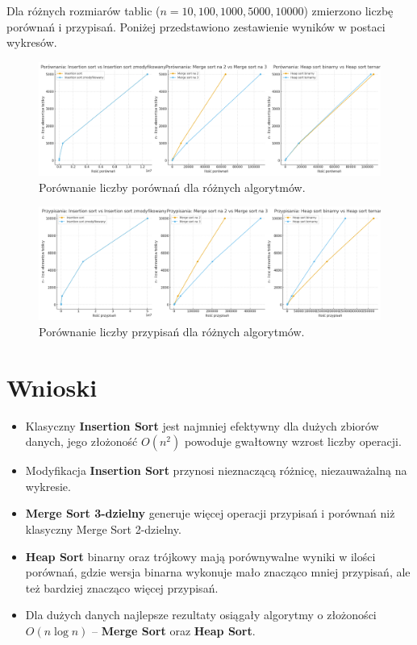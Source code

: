 \documentclass[12pt,a4paper]{article}
\begin{document}
Dla różnych rozmiarów tablic ($n = 10, 100, 1000, 5000, 10000$) zmierzono liczbę porównań i przypisań.  
Poniżej przedstawiono zestawienie wyników w postaci wykresów.

\begin{figure}[H]
    \centering
    \includegraphics[width=0.9\linewidth]{wykresy_porownania.png}
    \caption{Porównanie liczby porównań dla różnych algorytmów.}
\end{figure}

\begin{figure}[H]
    \centering
    \includegraphics[width=0.9\linewidth]{wykresy_przypisania.png}
    \caption{Porównanie liczby przypisań dla różnych algorytmów.}
\end{figure}

\section{Wnioski}
\begin{itemize}
  \item Klasyczny \textbf{Insertion Sort} jest najmniej efektywny dla dużych zbiorów danych, jego złożoność $O(n^2)$ powoduje gwałtowny wzrost liczby operacji.
  \item Modyfikacja \textbf{Insertion Sort} przynosi nieznaczącą różnicę, niezauważalną na wykresie.
  \item \textbf{Merge Sort 3-dzielny} generuje więcej operacji przypisań i porównań niż klasyczny Merge Sort 2-dzielny.
  \item \textbf{Heap Sort} binarny oraz trójkowy mają porównywalne wyniki w ilości porównań, gdzie wersja binarna wykonuje mało znacząco mniej przypisań, ale też bardziej znacząco więcej przypisań.
  \item Dla dużych danych najlepsze rezultaty osiągały algorytmy o złożoności $O(n \log n)$ – \textbf{Merge Sort} oraz \textbf{Heap Sort}.
\end{itemize}
\end{document}
